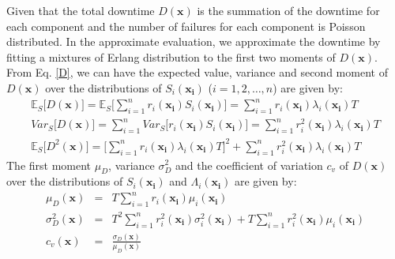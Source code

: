 \documentclass[preprint,12pt]{elsarticle}
\begin{document}
Given that the total downtime $D(\boldsymbol{x})$ is the summation of the downtime for each component and the number of failures for each component is Poisson distributed. In the approximate evaluation, we approximate the downtime by fitting a mixtures of Erlang distribution to the first two moments of $D(\boldsymbol{x})$. From Eq. \eqref{D}, we can have the expected value, variance and second moment of $D(\boldsymbol{x})$ over the distributions of $S_{i}(\boldsymbol{x_{i}})$ ($i=1,2,\dots,n$) are given by:
\begin{eqnarray}
\mathbb{E}_{S}\bigg[D(\boldsymbol{x})\bigg]=\mathbb{E}_{S}\bigg[\sum_{i=1}^{n}{r_{i}(\boldsymbol{x_{i}})S_{i}(\boldsymbol{x_{i}})}\bigg]=\sum_{i=1}^{n}{r_{i}(\boldsymbol{x_{i}})\lambda_{i}(\boldsymbol{x_{i}})T}
\label{ED1}\\
Var_{S}\bigg[D(\boldsymbol{x})\bigg]=\sum_{i=1}^{n}{Var_{S}\bigg[{r_{i}(\boldsymbol{x_{i}})S_{i}(\boldsymbol{x_{i}})}\bigg]}=\sum_{i=1}^{n}{r_{i}^{2}(\boldsymbol{x_{i}})\lambda_{i}(\boldsymbol{x_{i}})T}
\label{VD1}\\
\mathbb{E}_{S}\bigg[D^{2}(\boldsymbol{x}) \bigg]= \bigg[\sum_{i=1}^{n}{r_{i}(\boldsymbol{x_{i}})\lambda_{i}(\boldsymbol{x_{i}})T}\bigg]^{2} + \sum_{i=1}^{n}{r_{i}^{2}(\boldsymbol{x_{i}})\lambda_{i}(\boldsymbol{x_{i}})T}
\end{eqnarray}
The first moment $\mu_{D}$, variance $\sigma^{2}_{D}$ and the coefficient of variation $c_{v}$  of $D(\boldsymbol{x})$ over the distributions of $S_{i}(\boldsymbol{x_{i}})$ and $\Lambda_{i}(\boldsymbol{x_{i}})$ are given by:
\begin{eqnarray}
\mu_{D}(\boldsymbol{x})&=&T\sum_{i=1}^{n}{r_{i}(\boldsymbol{x_i})\mu_{i}(\boldsymbol{x_i})}
\label{muD}\\
\sigma^{2}_{D}(\boldsymbol{x})&=&T^{2}\sum_{i=1}^{n}{r_{i}^{2}(\boldsymbol{x_i})\sigma_{i}^{2}(\boldsymbol{x_i})}+T\sum_{i=1}^{n}{r_{i}^{2}(\boldsymbol{x_i})\mu_{i}(\boldsymbol{x_i})} \label{sigma}\\
c_{v}(\boldsymbol{x}) &=& \frac{\sigma_{D}(\boldsymbol{x})}{\mu_{D}(\boldsymbol{x})}
\end{eqnarray}
\end{document}
